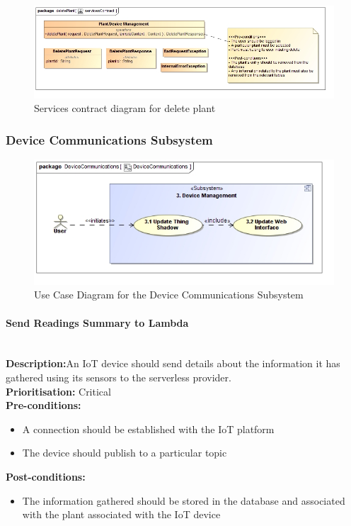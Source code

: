 \documentclass{article}
\begin{document}
\begin{figure}[H]
	\includegraphics[width=\linewidth]{images/ServicesContracts/deletePlant.jpg}
	\caption{Services contract diagram for delete plant}
\end{figure}

\subsubsection{Device Communications Subsystem}
	
	\begin{figure}[H]
		\includegraphics[width=\linewidth]{images/UseCases/DeviceCommunications.jpg}
		\caption{Use Case Diagram for the Device Communications Subsystem}
	\end{figure}
	
\paragraph{Send Readings Summary to Lambda}\mbox{}\\
\textbf{Description:}An IoT device should send details about the information it has gathered using its sensors to the serverless provider.\\
\textbf{Prioritisation:} Critical\\		
\textbf{Pre-conditions:}
\begin{itemize}
	\item A connection should be established with the IoT platform
	\item The device should publish to a particular topic
\end{itemize}
\textbf{Post-conditions:}
\begin{itemize}
	\item The information gathered should be stored in the database and associated with the plant associated with the IoT device
\end{itemize}
\end{document}

